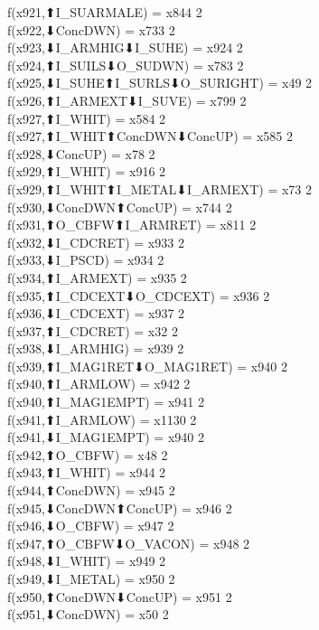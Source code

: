 f(x921,⬆I_SUARMALE) = x844 {2} \\
f(x922,⬇ConcDWN) = x733 {2} \\
f(x923,⬇I_ARMHIG⬇I_SUHE) = x924 {2} \\
f(x924,⬆I_SUILS⬇O_SUDWN) = x783 {2} \\
f(x925,⬇I_SUHE⬆I_SURLS⬇O_SURIGHT) = x49 {2} \\
f(x926,⬆I_ARMEXT⬇I_SUVE) = x799 {2} \\
f(x927,⬆I_WHIT) = x584 {2} \\
f(x927,⬆I_WHIT⬆ConcDWN⬇ConcUP) = x585 {2} \\
f(x928,⬇ConcUP) = x78 {2} \\
f(x929,⬆I_WHIT) = x916 {2} \\
f(x929,⬆I_WHIT⬆I_METAL⬇I_ARMEXT) = x73 {2} \\
f(x930,⬇ConcDWN⬆ConcUP) = x744 {2} \\
f(x931,⬆O_CBFW⬆I_ARMRET) = x811 {2} \\
f(x932,⬇I_CDCRET) = x933 {2} \\
f(x933,⬇I_PSCD) = x934 {2} \\
f(x934,⬆I_ARMEXT) = x935 {2} \\
f(x935,⬆I_CDCEXT⬇O_CDCEXT) = x936 {2} \\
f(x936,⬇I_CDCEXT) = x937 {2} \\
f(x937,⬆I_CDCRET) = x32 {2} \\
f(x938,⬇I_ARMHIG) = x939 {2} \\
f(x939,⬆I_MAG1RET⬇O_MAG1RET) = x940 {2} \\
f(x940,⬆I_ARMLOW) = x942 {2} \\
f(x940,⬆I_MAG1EMPT) = x941 {2} \\
f(x941,⬆I_ARMLOW) = x1130 {2} \\
f(x941,⬇I_MAG1EMPT) = x940 {2} \\
f(x942,⬆O_CBFW) = x48 {2} \\
f(x943,⬆I_WHIT) = x944 {2} \\
f(x944,⬆ConcDWN) = x945 {2} \\
f(x945,⬇ConcDWN⬆ConcUP) = x946 {2} \\
f(x946,⬇O_CBFW) = x947 {2} \\
f(x947,⬆O_CBFW⬇O_VACON) = x948 {2} \\
f(x948,⬇I_WHIT) = x949 {2} \\
f(x949,⬇I_METAL) = x950 {2} \\
f(x950,⬆ConcDWN⬇ConcUP) = x951 {2} \\
f(x951,⬇ConcDWN) = x50 {2} \\
